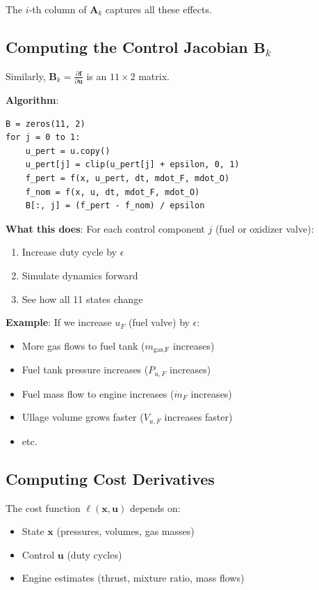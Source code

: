 \documentclass[11pt,a4paper]{article}
\begin{document}
The $i$-th column of $\mathbf{A}_k$ captures all these effects.

\subsection{Computing the Control Jacobian $\mathbf{B}_k$}

Similarly, $\mathbf{B}_k = \frac{\partial \mathbf{f}}{\partial \mathbf{u}}$ is an $11 \times 2$ matrix.

\textbf{Algorithm}:
\begin{verbatim}
B = zeros(11, 2)
for j = 0 to 1:
    u_pert = u.copy()
    u_pert[j] = clip(u_pert[j] + epsilon, 0, 1)
    f_pert = f(x, u_pert, dt, mdot_F, mdot_O)
    f_nom = f(x, u, dt, mdot_F, mdot_O)
    B[:, j] = (f_pert - f_nom) / epsilon
\end{verbatim}

\textbf{What this does}: For each control component $j$ (fuel or oxidizer valve):
\begin{enumerate}
    \item Increase duty cycle by $\epsilon$
    \item Simulate dynamics forward
    \item See how all 11 states change
\end{enumerate}

\textbf{Example}: If we increase $u_F$ (fuel valve) by $\epsilon$:
\begin{itemize}
    \item More gas flows to fuel tank ($m_{\text{gas,F}}$ increases)
    \item Fuel tank pressure increases ($P_{u,F}$ increases)
    \item Fuel mass flow to engine increases ($\dot{m}_F$ increases)
    \item Ullage volume grows faster ($V_{u,F}$ increases faster)
    \item etc.
\end{itemize}

\subsection{Computing Cost Derivatives}

The cost function $\ell(\mathbf{x}, \mathbf{u})$ depends on:
\begin{itemize}
    \item State $\mathbf{x}$ (pressures, volumes, gas masses)
    \item Control $\mathbf{u}$ (duty cycles)
    \item Engine estimates (thrust, mixture ratio, mass flows)
\end{itemize}
\end{document}
